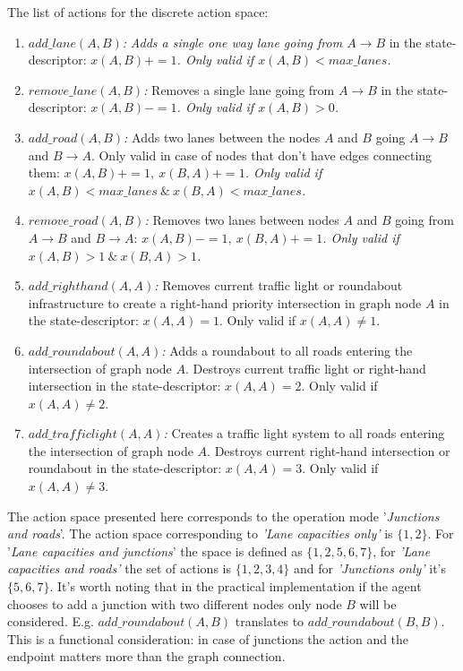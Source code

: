 \documentclass[
]{elteikthesis}[2023/04/10]
\begin{document}
The list of actions for the discrete action space: 
\begin{enumerate}
\item \emph{$add\_lane(A,B)$}\textit{: }\textit{\emph{Adds a single one
way lane going from $A\rightarrow B$}} in the state-descriptor:\textit{\emph{
$x(A,B)+=1$. Only valid if $x(A,B)<max\_lanes$.}}
\item \emph{$remove\_lane(A,B)$: }Removes a single lane going from $A\rightarrow B$
in the state-descriptor: \textit{\emph{$x(A,B)-=1$. Only valid if
$x(A,B)>0$.}}
\item \emph{$add\_road(A,B)$: }Adds two lanes between the nodes $A$ and
$B$ going $A\rightarrow B$ and $B\rightarrow A$. Only valid in
case of nodes that don't have edges connecting them: \textit{\emph{$x(A,B)+=1,\ x(B,A)+=1$.
Only valid if $x(A,B)<max\_lanes\ \&\ x(B,A)<max\_lanes$.}}
\item \emph{$remove\_road(A,B)$: }Removes two lanes between nodes $A$
and $B$ going from $A\rightarrow B$ and $B\rightarrow A$: \textit{\emph{$x(A,B)-=1,\ x(B,A)+=1$.
Only valid if $x(A,B)>1\ \&\ x(B,A)>1$.}}
\item \emph{$add\_righthand(A,A)$: }Removes current traffic light or roundabout
infrastructure to create a right-hand priority intersection in graph
node $A$ in the state-descriptor: $x(A,A)=1$. Only valid if $x(A,A)\neq1$.
\item \emph{$add\_roundabout(A,A)$: }Adds a roundabout to all roads entering
the intersection of graph node $A$. Destroys current traffic light
or right-hand intersection in the state-descriptor: $x(A,A)=2$. Only
valid if $x(A,A)\neq2.$
\item \emph{$add\_trafficlight(A,A)$: }Creates a traffic light system to
all roads entering the intersection of graph node $A$. Destroys current
right-hand intersection or roundabout in the state-descriptor: $x(A,A)=3$.
Only valid if $x(A,A)\neq3.$
\end{enumerate}
The action space presented here corresponds to the operation mode
'\emph{Junctions and roads}'. The action space corresponding to \emph{'Lane
capacities only' }is $\{1,2\}$. For '\emph{Lane capacities and junctions}'
the space is defined as $\{1,2,5,6,7\}$, for \emph{'Lane capacities
and roads' }the set of actions is $\{1,2,3,4\}$ and for \emph{'Junctions
only' }it's $\{5,6,7\}$. It's worth noting that in the practical
implementation if the agent chooses to add a junction with two different
nodes only node $B$ will be considered. E.g. $add\_roundabout(A,B)$
translates to $add\_roundabout(B,B)$. This is a functional consideration:
in case of junctions the action and the endpoint matters more than
the graph connection. 
\end{document}
